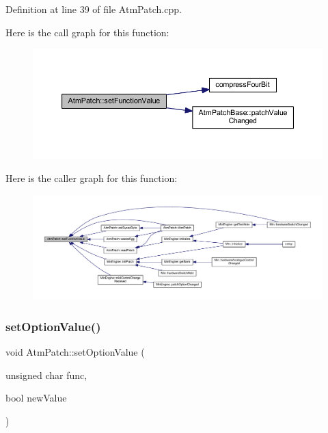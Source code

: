 Definition at line 39 of file Atm\+Patch.\+cpp.

Here is the call graph for this function\+:
\nopagebreak
\begin{figure}[H]
\begin{center}
\leavevmode
\includegraphics[width=350pt]{class_atm_patch_ad2fe7a265755afc95a36752b86b6a7e2_cgraph}
\end{center}
\end{figure}
Here is the caller graph for this function\+:
\nopagebreak
\begin{figure}[H]
\begin{center}
\leavevmode
\includegraphics[width=350pt]{class_atm_patch_ad2fe7a265755afc95a36752b86b6a7e2_icgraph}
\end{center}
\end{figure}
\mbox{\label{class_atm_patch_a1139606bcbffe63881b3f175f577d8e1}} 
\subsubsection{\texorpdfstring{set\+Option\+Value()}{setOptionValue()}}
{\footnotesize\ttfamily void Atm\+Patch\+::set\+Option\+Value (\begin{DoxyParamCaption}\item[{unsigned char}]{func,  }\item[{bool}]{new\+Value }\end{DoxyParamCaption})}



